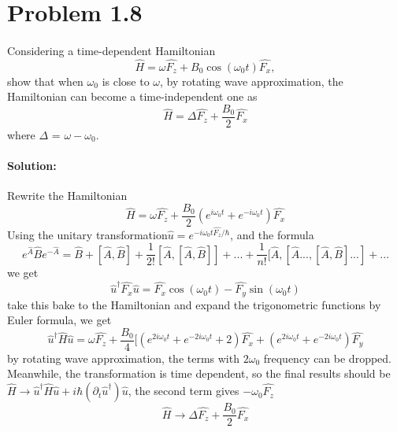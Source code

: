 \def\ahf{\alpha_{\mathrm{hf}}}
\def\muB{\mu_{\mathrm{B}}}
\def\gS{g_{\mathrm{S}}}
\def\muN{\mu_{\mathrm{N}}}
\def\gI{g_{\mathrm{I}}}

\section*{Problem 1.8}
\paragraph{} Considering a time-dependent Hamiltonian
\begin{equation}
    \hat{H} = \omega \hat{F_z} + B_0 \cos(\omega _0t) \hat{F_x},
\end{equation}
show that when $\omega_0$ is close to $\omega$, by rotating wave approximation, the Hamiltonian can become a time-independent one as
\begin{equation}
    \hat{H} = \Delta \hat{F_z} + \frac{B_0}{2} \hat{F_x}
\end{equation}
where $\Delta$ = $\omega - \omega_0$.
\paragraph{Solution:} 
Rewrite the Hamiltonian
\begin{equation}
    \hat{H} = \omega \hat{F_z} + \frac{B_0}{2}(e^{i\omega_0 t}+e^{-i\omega_0 t})\hat{F_x} 
\end{equation}
Using the unitary transformation$\hat{u}=e^{-i\omega_0 t \hat{F_z}/\hbar}$, and the formula 
\begin{equation}
    e^{\hat{A}} \hat{B} e^{-\hat{A}} = \hat{B} + [\hat{A},\hat{B}] + \frac{1}{2!}[\hat{A},[\hat{A},\hat{B}]]+...+\frac{1}{n!}[\hat{A},[\hat{A}...,[\hat{A},\hat{B}]...]+...   
\end{equation}
we get 
\begin{equation}
    \hat{u}^{\dag} \hat{F_x} \hat{u} = \hat{F_x}\cos(\omega_0 t)-\hat{F_y} \sin(\omega_0 t)
\end{equation}
take this bake to the Hamiltonian and expand the trigonometric functions by Euler formula, we get
\begin{equation}
    \hat{u}^{\dag} \hat{H} \hat{u} = \omega \hat{F_z} + \frac{B_0}{4} [(e^{2i\omega_0 t}+e^{-2i\omega_0 t}+2)\hat{F_x} + (e^{2i\omega_0 t}+e^{-2i\omega_0 t})\hat{F_y}
\end{equation}
by rotating wave approximation, the terms with $2\omega_0$ frequency can be dropped. Meanwhile, the transformation is time dependent, so the final results should be $\hat{H} \to \hat{u}^{\dag} \hat{H} \hat{u} + i\hbar (\partial_t \hat{u}^{\dag})\hat{u}$, the second term gives $-\omega_0 \hat{F_z}$
\begin{equation}
    \hat{H} \to \Delta \hat{F_z} + \frac{B_0}{2} \hat{F_x}
\end{equation}


